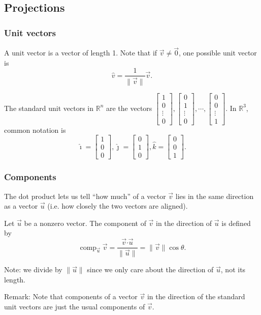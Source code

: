 \documentclass[11pt,t]{beamer}
\newcommand{\R}{\mathbb{R}}
\newcommand{\len}[1]{\lVert #1\rVert}
\newcommand{\dotp}{\boldsymbol{\cdot}}
\newcommand{\comp}[2]{\operatorname{comp}_{\vec{#1}}\vec{#2}}
\begin{document}
\subsection{Projections}
\begin{frame}
\frametitle{Unit vectors}

A \alert{unit vector} is a vector of length 1. Note that if $\vec{v}\neq\vec{0}$, one possible unit vector is
\[
\hat{v} = \frac{1}{\len{\vec{v}}}\vec{v}.
\]

The \alert{standard unit vectors} in $\R^n$ are the vectors $\begin{bmatrix}
1\\0\\\vdots \\0
\end{bmatrix},\begin{bmatrix}
0\\1\\\vdots\\0
\end{bmatrix},\cdots,\begin{bmatrix}
0\\0\\\vdots\\1
\end{bmatrix}.$ In $\R^3$, common notation is
\[
\hat{\imath} = \begin{bmatrix}1\\0\\0\end{bmatrix}, \hat{\jmath} = \begin{bmatrix}0\\1\\0\end{bmatrix}, \hat{k} = \begin{bmatrix}0\\0\\1\end{bmatrix}.
\]
\end{frame}
\begin{frame}
\frametitle{Components}
The dot product lets us tell ``how much'' of a vector $\vec{v}$ lies in the same direction as a vector $\vec{u}$ (i.e. how closely the two vectors are aligned).
\begin{definition}
Let $\vec{u}$ be a nonzero vector. The \alert{component} of $\vec{v}$ in the direction of $\vec{u}$ is defined by
\[
\comp{u}{v} = \frac{\vec{v}\dotp\vec{u}}{\len{\vec{u}}} = \len{\vec{v}}\cos\theta.
\]
\end{definition}
Note: we divide by $\len{\vec{u}}$ since we only care about the direction of $\vec{u}$, not its length.

\alert{Remark:} Note that components of a vector $\vec{v}$ in the direction of the standard unit vectors are just the usual components of $\vec{v}$.
\end{frame}
\end{document}
